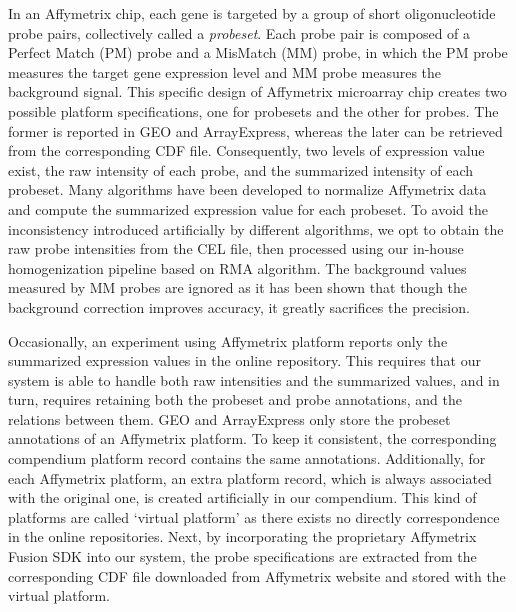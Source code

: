In an Affymetrix chip, each gene is targeted by a group of short
oligonucleotide probe pairs, collectively called a \textit{probeset}.
%
Each probe pair is composed of a Perfect Match (PM) probe and a MisMatch
(MM) probe, in which the PM probe measures the target gene expression
level and MM probe measures the background signal.
%
This specific design of Affymetrix microarray chip creates two possible
platform specifications, one for probesets and the other for probes.
%
The former is reported in GEO and ArrayExpress, whereas the later can be
retrieved from the corresponding CDF file.
%
Consequently, two levels of expression value exist, the raw intensity of
each probe, and the summarized intensity of each probeset.
%
Many algorithms \cite{Irizarry2003, Li2001, Hubbell2002} have been developed to
normalize Affymetrix data and compute the summarized expression value for each
probeset.
%
To avoid the inconsistency introduced artificially by different algorithms, we
opt to obtain the raw probe intensities from the CEL file, then processed using
our in-house homogenization pipeline based on RMA algorithm.
%
%
%
The background values measured by MM probes are ignored as it has been shown
that though the background correction improves accuracy, it greatly sacrifices
the precision\cite{Irizarry2006}.


Occasionally, an experiment using Affymetrix platform reports only the
summarized expression values in the online repository.
%
This requires that our system is able to handle both raw intensities and the
summarized values, and in turn, requires retaining both the probeset and probe
annotations, and the relations between them.
%
GEO and ArrayExpress only store the probeset annotations of an Affymetrix
platform.
%
To keep it consistent, the corresponding compendium platform record contains
the same annotations.
%
Additionally, for each Affymetrix platform, an extra platform record, which is
always associated with the original one, is created artificially in our
compendium.
%
This kind of platforms are called `virtual platform' as there exists no
directly correspondence in the online repositories.
%
Next, by incorporating the proprietary Affymetrix Fusion SDK into our system,
the probe specifications are extracted from the corresponding CDF file
downloaded from Affymetrix website and stored with the virtual platform.
%
% 


